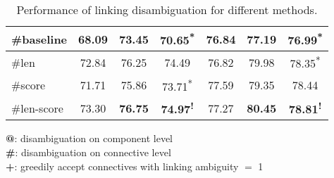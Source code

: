 \begin{table}[ht]
\begin{tabular}{|l|c|c|c|c|c|c|}
\hhline{|=|=|=|=|=|=|=|}

\#baseline  &     68.09     &     73.45  &     70.65\textsuperscript{*} &     76.84     &     77.19  &     76.99\textsuperscript{*} \\ \hline
\#len       &     72.84     &     76.25  &     74.49\textsuperscript{ } &     76.82     &     79.98  &     78.35\textsuperscript{*} \\ \hline
\#score     &     71.71     &     75.86  &     73.71\textsuperscript{*} &     77.59     &     79.35  &     78.44\textsuperscript{ } \\ \hline
\#len-score &     73.30     & \bf 76.75  & \bf 74.97\textsuperscript{!} &     77.27     & \bf 80.45  & \bf 78.81\textsuperscript{!} \\ \hline

\end{tabular}
\begin{flushleft}
\small
\textbf{@}: disambiguation on component level \\
\textbf{\#}: disambiguation on connective level \\
\textbf{+}: greedily accept connectives with linking ambiguity $=$ 1
\end{flushleft}
\caption{\label{t:linking-methods} Performance of linking
disambiguation for different methods. }
\end{table}


